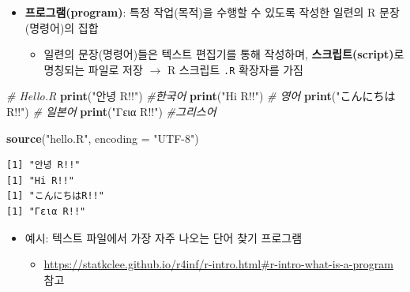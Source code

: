 \documentclass[
  11pt,
]{krantz}
\newenvironment{Shaded}{\begin{snugshade}}{\end{snugshade}}
\newcommand{\CommentTok}[1]{\textcolor[rgb]{0.37,0.37,0.37}{\textit{#1}}}
\newcommand{\DataTypeTok}[1]{\textcolor[rgb]{0.27,0.27,0.27}{#1}}
\newcommand{\KeywordTok}[1]{\textcolor[rgb]{0.27,0.27,0.27}{\textbf{#1}}}
\newcommand{\NormalTok}[1]{#1}
\newcommand{\StringTok}[1]{\textcolor[rgb]{0.5,0.5,0.5}{#1}}
\providecommand{\tightlist}{%
  \setlength{\itemsep}{0pt}\setlength{\parskip}{0pt}}
\begin{document}
\begin{itemize}
\tightlist
\item
  \textbf{프로그램(program)}: 특정 작업(목적)을 수행할 수 있도록 작성한 일련의 R 문장(명령어)의 집합

  \begin{itemize}
  \tightlist
  \item
    일련의 문장(명령어)들은 텍스트 편집기를 통해 작성하며, \textbf{스크립트(script)}로 명칭되는 파일로 저장 \(\rightarrow\) R 스크립트 \texttt{.R} 확장자를 가짐
  \end{itemize}
\end{itemize}

\footnotesize

\begin{Shaded}
\begin{Highlighting}[]
\CommentTok{# Hello.R }
\KeywordTok{print}\NormalTok{(}\StringTok{"안녕 R!!"}\NormalTok{) }\CommentTok{#한국어}
\KeywordTok{print}\NormalTok{(}\StringTok{"Hi R!!"}\NormalTok{) }\CommentTok{# 영어}
\KeywordTok{print}\NormalTok{(}\StringTok{"こんにちはR!!"}\NormalTok{) }\CommentTok{# 일본어}
\KeywordTok{print}\NormalTok{(}\StringTok{"Γεια R!!"}\NormalTok{) }\CommentTok{#그리스어}
\end{Highlighting}
\end{Shaded}

\normalsize

\footnotesize

\begin{Shaded}
\begin{Highlighting}[]
\KeywordTok{source}\NormalTok{(}\StringTok{"hello.R"}\NormalTok{, }\DataTypeTok{encoding =} \StringTok{"UTF-8"}\NormalTok{)}
\end{Highlighting}
\end{Shaded}

\begin{verbatim}
[1] "안녕 R!!"
[1] "Hi R!!"
[1] "こんにちはR!!"
[1] "Γεια R!!"
\end{verbatim}

\normalsize

\begin{itemize}
\tightlist
\item
  예시: 텍스트 파일에서 가장 자주 나오는 단어 찾기 프로그램

  \begin{itemize}
  \tightlist
  \item
    \url{https://statkclee.github.io/r4inf/r-intro.html\#r-intro-what-is-a-program} 참고
  \end{itemize}
\end{itemize}
\end{document}
